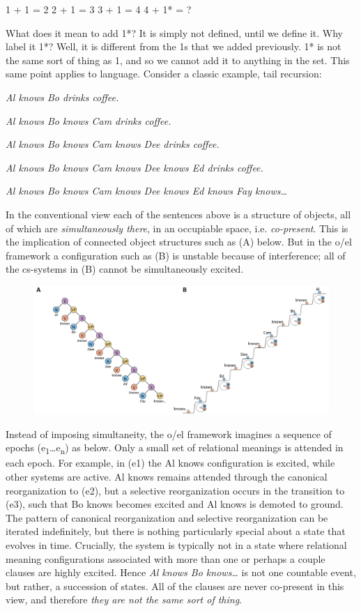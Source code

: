     1 + 1 = 2    2 + 1 = 3     3 + 1 = 4    4 + 1* = ?

  What does it mean to add 1*? It is simply not defined, until we define it. Why label it 1*? Well, it is different from the 1s that we added previously. 1* is not the same sort of thing as 1, and so we cannot add it to anything in the set. This same point applies to language. Consider a classic example, tail recursion:

\textit{Al knows Bo drinks coffee.}

\textit{Al knows Bo knows Cam drinks coffee.}

\textit{Al knows Bo knows Cam knows Dee drinks coffee.}

\textit{Al knows Bo knows Cam knows Dee knows Ed drinks coffee.}

\textit{Al knows Bo knows Cam knows Dee knows Ed knows Fay knows…}

  In the conventional view each of the sentences above is a structure of objects, all of which are \textit{simultaneously there}, in an occupiable space, i.e. \textit{co-present}. This is the implication of connected object structures such as (A) below. But in the o/el framework a configuration such as (B) is unstable because of interference; all of the cs-systems in (B) cannot be simultaneously excited. 

  
\begin{figure}
\includegraphics[width=\textwidth]{figures/Tilsen-img105.png}
\caption{\missingcaption}
\label{fig:}
\end{figure}
 

  Instead of imposing simultaneity, the o/el framework imagines a sequence of epochs (e\textsubscript{1}…e\textsubscript{n}) as below. Only a small set of relational meanings is attended in each epoch. For example, in (e1) the {\textbar}Al knows{\textbar} configuration is excited, while other systems are active. {\textbar}Al knows{\textbar} remains attended through the canonical reorganization to (e2),  but a selective reorganization occurs in the transition to (e3), such that {\textbar}Bo knows{\textbar} becomes excited and {\textbar}Al knows{\textbar} is demoted to ground. The pattern of canonical reorganization and selective reorganization can be iterated indefinitely, but there is nothing particularly special about a state that evolves in time. Crucially, the system is typically not in a state where relational meaning configurations associated with more than one or perhaps a couple clauses are highly excited. Hence \textit{Al knows Bo knows…} is not one countable event, but rather, a succession of states. All of the clauses are never co-present in this view, and therefore \textit{they are not the same sort of thing}.

